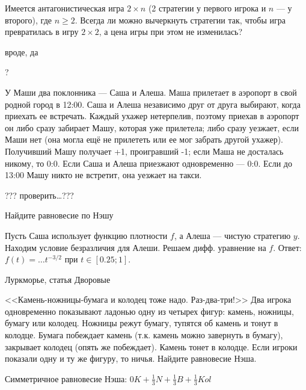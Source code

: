 \begin{problem}

Имеется антагонистическая игра $2\times n$ (2 стратегии у первого игрока и $n$ --- у второго), где $n\ge 2$. Всегда ли можно вычеркнуть стратегии так, чтобы игра превратилась в игру $2\times 2$, а цена игры при этом не изменилась?

\begin{sol}
 вроде, да
\end{sol}
\end{problem}

\begin{problem}
\begin{source}
\cite{ferguson:tn}?\end{source}
У Маши два поклонника --- Саша и Алеша. Маша прилетает в аэропорт в свой родной город в 12:00. Саша и Алеша независимо друг от друга выбирают, когда приехать ее встречать. Каждый ухажер нетерпелив, поэтому приехав в аэропорт он либо сразу забирает Машу, которая уже прилетела; либо сразу уезжает, если Маши нет (она могла ещё не прилететь или ее мог забрать другой ухажер). Получивший Машу получает +1, проигравший -1; если Маша не досталась никому, то 0:0. Если Саша и Алеша приезжают одновременно --- 0:0. Если до 13:00 Машу никто не встретит, она уезжает на такси.

??? проверить\ldots ???


Найдите равновесие по Нэшу






\begin{sol}
Пусть Саша использует функцию плотности $f$, а Алеша --- чистую стратегию $y$. Находим условие безразличия для Алеши. Решаем дифф. уравнение на $f$. Ответ: $f(t)=\ldots t^{-3/2}$ при $t\in[0.25;1]$.
\end{sol}
\end{problem}



\begin{problem}[КНБ-2.]
\begin{source}
Луркморье, статья Дворовые
\end{source}
<<Камень-ножницы-бумага и колодец тоже надо. Раз-два-три!>>
Два игрока одновременно показывают ладонью одну из четырех фигур: камень, ножницы, бумагу или колодец. Ножницы режут бумагу, тупятся об камень и тонут в колодце. Бумага побеждает камень (т.к. камень можно завернуть в бумагу), закрывает колодец (опять же побеждает). Камень тонет в колодце. Если игроки показали одну и ту же фигуру, то ничья. Найдите равновесие Нэша.

\begin{sol}
Симметричное равновесие Нэша: $0K+\frac{1}{3}N+\frac{1}{3}B+\frac{1}{3}Kol$
\end{sol}
\end{problem}

